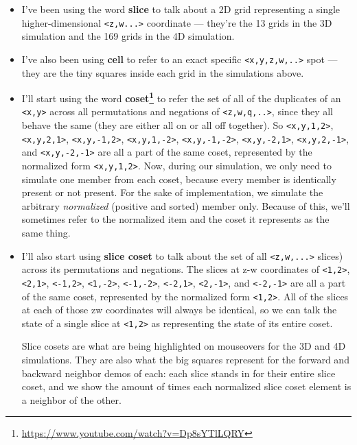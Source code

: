 \documentclass[]{article}
\renewcommand{\href}[2]{#2\footnote{\url{#1}}}
\begin{document}
\begin{itemize}
\item
  I've been using the word \textbf{slice} to talk about a 2D grid representing a
  single higher-dimensional \texttt{\textless{}z,w...\textgreater{}} coordinate
  --- they're the 13 grids in the 3D simulation and the 169 grids in the 4D
  simulation.
\item
  I've also been using \textbf{cell} to refer to an exact specific
  \texttt{\textless{}x,y,z,w,..\textgreater{}} spot --- they are the tiny
  squares inside each grid in the simulations above.
\item
  I'll start using the word
  \textbf{\href{https://www.youtube.com/watch?v=Dp8sYTlLQRY}{coset}} to refer
  the set of all of the duplicates of an \texttt{\textless{}x,y\textgreater{}}
  across all permutations and negations of
  \texttt{\textless{}z,w,q,..\textgreater{}}, since they all behave the same
  (they are either all on or all off together). So
  \texttt{\textless{}x,y,1,2\textgreater{}},
  \texttt{\textless{}x,y,2,1\textgreater{}},
  \texttt{\textless{}x,y,-1,2\textgreater{}},
  \texttt{\textless{}x,y,1,-2\textgreater{}},
  \texttt{\textless{}x,y,-1,-2\textgreater{}},
  \texttt{\textless{}x,y,-2,1\textgreater{}},
  \texttt{\textless{}x,y,2,-1\textgreater{}}, and
  \texttt{\textless{}x,y,-2,-1\textgreater{}} are all a part of the same coset,
  represented by the normalized form \texttt{\textless{}x,y,1,2\textgreater{}}.
  Now, during our simulation, we only need to simulate one member from each
  coset, because every member is identically present or not present. For the
  sake of implementation, we simulate the arbitrary \emph{normalized} (positive
  and sorted) member only. Because of this, we'll sometimes refer to the
  normalized item and the coset it represents as the same thing.
\item
  I'll also start using \textbf{slice coset} to talk about the set of all
  \texttt{\textless{}z,w,...\textgreater{}} slices) across its permutations and
  negations. The slices at z-w coordinates of
  \texttt{\textless{}1,2\textgreater{}}, \texttt{\textless{}2,1\textgreater{}},
  \texttt{\textless{}-1,2\textgreater{}},
  \texttt{\textless{}1,-2\textgreater{}},
  \texttt{\textless{}-1,-2\textgreater{}},
  \texttt{\textless{}-2,1\textgreater{}},
  \texttt{\textless{}2,-1\textgreater{}}, and
  \texttt{\textless{}-2,-1\textgreater{}} are all a part of the same coset,
  represented by the normalized form \texttt{\textless{}1,2\textgreater{}}. All
  of the slices at each of those zw coordinates will always be identical, so we
  can talk the state of a single slice at \texttt{\textless{}1,2\textgreater{}}
  as representing the state of its entire coset.

  Slice cosets are what are being highlighted on mouseovers for the 3D and 4D
  simulations. They are also what the big squares represent for the forward and
  backward neighbor demos of each: each slice stands in for their entire slice
  coset, and we show the amount of times each normalized slice coset element is
  a neighbor of the other.
\end{itemize}
\end{document}
